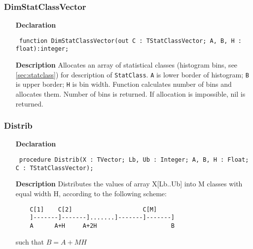 \documentclass[12pt,a4paper,oneside]{report}
\newcommand{\declarationitem}[1]{\textbf{#1}}
\newcommand{\descriptiontitle}[1]{\textbf{#1}}
\newcommand{\code}[1]{\texttt{#1}}
\begin{document}
\subsubsection{DimStatClassVector}
\label{udistrib-DimStatClassVector}
\begin{itemize}\item[\declarationitem{Declaration}\hfill]
	\begin{flushleft}
		\code{
			function DimStatClassVector(out C : TStatClassVector; A, B, H : float):integer;}
	\end{flushleft}
	\item[\descriptiontitle{Description}]
	Allocates an array of statistical classes (histogram bins, see \ref{sec:statclass}) for description of \code{StatClass}.
	\code{A} is lower border of histogram; \code{B} is upper border; \code{H} is bin width.
	Function calculates number of bins and allocates them. Number of bins is returned. If allocation is impossible, nil is returned.
\end{itemize}
\subsubsection{Distrib}
\label{udistrib-Distrib}
\begin{itemize}\item[\declarationitem{Declaration}\hfill]
	\begin{flushleft}
		\code{
			procedure Distrib(X : TVector; Lb, Ub : Integer; A, B, H : Float; C : TStatClassVector);}
	\end{flushleft}
	\item[\descriptiontitle{Description}]
	Distributes the values of array X[Lb..Ub] into M classes with equal width H, according to the following scheme:
	\begin{verbatim}
	C[1]    C[2]                    C[M]
	]-------]-------].......]-------]-------]
	A      A+H     A+2H                     B
	\end{verbatim}	
	such that $ B = A + M H$
\end{itemize}
\end{document}
